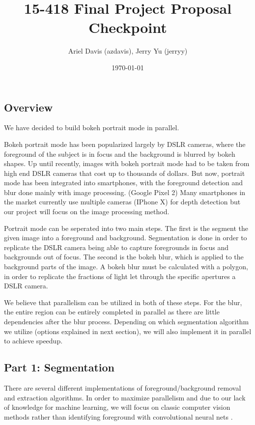 \documentclass[12pt]{article}
\author{Ariel Davis (azdavis), Jerry Yu (jerryy)}
\date{\today}
\title{15-418 Final Project Proposal Checkpoint}
\begin{document}
\maketitle

\subsection*{Overview}
We have decided to build bokeh portrait mode in parallel.

Bokeh portrait mode has been popularized largely by DSLR cameras, where the
foreground of the subject is in focus and the background is blurred by bokeh
shapes. Up until recently, images with bokeh portrait mode had to be taken
from high end DSLR cameras that cost up to thousands of dollars. But now,
portrait mode has been integrated into smartphones, with the foreground
detection and blur done mainly with image processing. (Google Pixel 2) Many
smartphones in the market currently use multiple cameras (IPhone X) for
depth detection but our project will focus on the image processing method.

Portrait mode can be seperated into two main steps. The first is the segment
the given image into a foreground and background. Segmentation is done in order
to replicate the DSLR camera being able to capture foregrounds in focus and
backgrounds out of focus.
The second is the bokeh blur, which is applied to the background parts of the
image. A bokeh blur must be calculated with a polygon, in order to replicate the
fractions of light let through the specific apertures a DSLR camera.

We believe that parallelism can be utilized in both of these steps. For the
blur, the entire region can be entirely completed in parallel as there are
little dependencies after the blur process. Depending on which segmentation
algorithm we utilize (options explained in next section), we will also
implement it in parallel to achieve speedup.

\subsection*{Part 1: Segmentation}
There are several different implementations of foreground/background removal
and extraction algorithms. In order to maximize parallelism and due to our lack
of knowledge for machine learning, we will focus on classic computer vision
methods rather than identifying foreground with convolutional neural nets
\cite{pixel-ml}.
\end{document}
